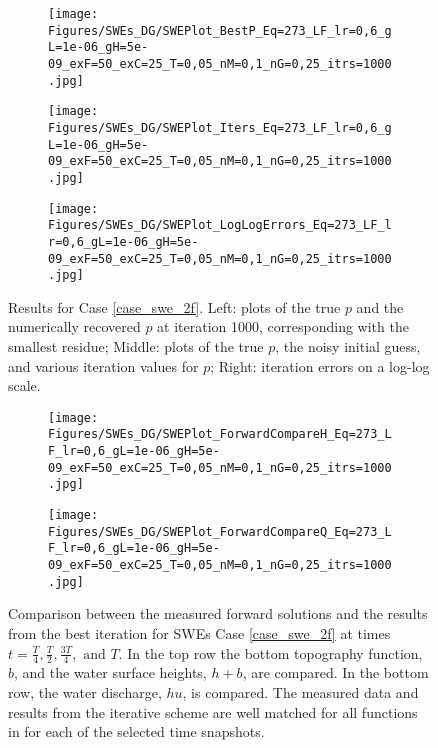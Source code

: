 \begin{figure}[h]
    \begin{subfigure}[t]{0.32\textwidth}
        \centering
        \texttt{[image: Figures/SWEs\_DG/SWEPlot\_BestP\_Eq=273\_LF\_lr=0,6\_gL=1e-06\_gH=5e-09\_exF=50\_exC=25\_T=0,05\_nM=0,1\_nG=0,25\_itrs=1000.jpg]}
    \end{subfigure}
    \begin{subfigure}[t]{0.32\textwidth}
        \centering
        \texttt{[image: Figures/SWEs\_DG/SWEPlot\_Iters\_Eq=273\_LF\_lr=0,6\_gL=1e-06\_gH=5e-09\_exF=50\_exC=25\_T=0,05\_nM=0,1\_nG=0,25\_itrs=1000.jpg]}
    \end{subfigure}
    \begin{subfigure}[t]{0.32\textwidth}
        \texttt{[image: Figures/SWEs\_DG/SWEPlot\_LogLogErrors\_Eq=273\_LF\_lr=0,6\_gL=1e-06\_gH=5e-09\_exF=50\_exC=25\_T=0,05\_nM=0,1\_nG=0,25\_itrs=1000.jpg]}
    \end{subfigure}
    \caption{Results for Case \eqref{case_swe_2f}. Left: plots of the true $p$ and the numerically recovered $p$ at iteration 1000, corresponding with the smallest residue; Middle: plots of the true $p$, the noisy initial guess, and various iteration values for $p$; Right: iteration errors on a log-log scale.}
    \label{fig:swe_2F}
\end{figure}

\begin{figure}[h]
    \begin{subfigure}[t]{\textwidth}
        \centering
        \texttt{[image: Figures/SWEs\_DG/SWEPlot\_ForwardCompareH\_Eq=273\_LF\_lr=0,6\_gL=1e-06\_gH=5e-09\_exF=50\_exC=25\_T=0,05\_nM=0,1\_nG=0,25\_itrs=1000.jpg]}
    \end{subfigure}
    \begin{subfigure}[t]{\textwidth}
        \centering
        \texttt{[image: Figures/SWEs\_DG/SWEPlot\_ForwardCompareQ\_Eq=273\_LF\_lr=0,6\_gL=1e-06\_gH=5e-09\_exF=50\_exC=25\_T=0,05\_nM=0,1\_nG=0,25\_itrs=1000.jpg]}
    \end{subfigure}
    \caption{Comparison between the measured forward solutions and the results from the best iteration for SWEs Case \eqref{case_swe_2f} at times $t=\frac{T}{4},\frac{T}{2},\frac{3T}{4}, \text{ and } T$. In the top row the bottom topography function, $b$, and the water surface heights, $h+b$, are compared. In the bottom row, the water discharge, $hu$, is compared. The measured data and results from the iterative scheme are well matched for all functions in for each of the selected time snapshots.}
    \label{fig:swe_2F_2}
\end{figure}

